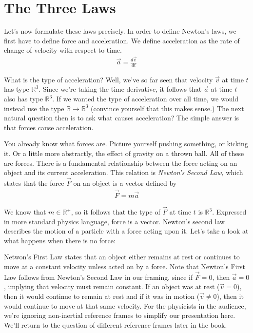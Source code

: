 \documentclass[book.tex]{subfiles}
\begin{document}
\section{The Three Laws}

Let's now formulate these laws precisely. In order to define Newton's laws, we first have to define force and acceleration. We define acceleration as the rate of change of velocity with respect to time.
\begin{align}
\vec{a} = \frac{d\vec{v}}{dt}
\end{align}

What is the type of acceleration? Well, we've so far seen that velocity $\vec{v}$ at time $t$ has type $\mathbb{R}^3$. Since we're taking the time derivative, it follows that $\vec{a}$ at time $t$ also has type $\mathbb{R}^3$. If we wanted the type of acceleration over all time, we would instead use the type $\mathbb{R} \to \mathbb{R}^3$ (convince yourself that this makes sense.) The next natural question then is to ask what causes acceleration? The simple answer is that forces cause acceleration.

You already know what forces are. Picture yourself pushing something, or kicking it. Or a little more abstractly, the effect of gravity on a thrown ball. All of these are forces. There is a fundamental relationship between the force acting on an object and its current acceleration. This relation is \textit{Newton's Second Law,} which states that the force $\vec{F}$ on an object is a vector defined by
\begin{align}
\vec{F} = m \vec{a}
\end{align}
\label{newton2}


We know that $m \in \mathbb{R}^+$, so it follows that the type of $\vec{F}$ at time $t$ is $\mathbb{R}^3$. Expressed in more standard physics language, force is a vector. Newton's second law describes the motion of a particle with a force acting upon it. Let's take a look at what happens when there is no force:

Netwon's First Law states that an object either remains at rest or continues to move at a constant velocity unless acted on by a force. Note that Newton's First Law follows from Newton's Second Law in our framing, since if $\vec{F} = 0$, then $\vec{a} = 0$, implying that velocity must remain constant. If an object was at rest ($\vec{v} = 0$), then it would continue to remain at rest and if it was in motion ($\vec{v} \neq  0$), then it would continue to move at that same velocity. For the physicists in the audience, we're ignoring non-inertial reference frames to simplify our presentation here. We'll return to the question of different reference frames later in the book.
\end{document}
